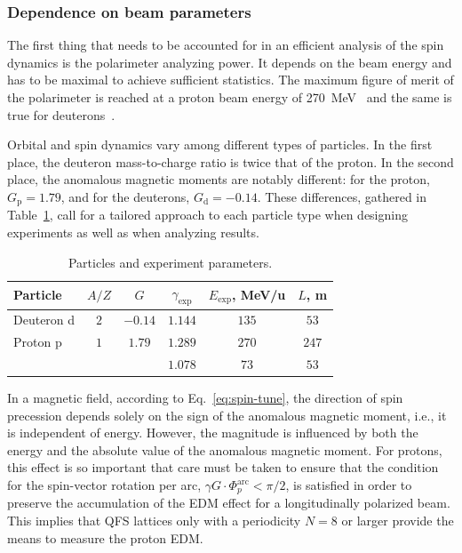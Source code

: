 \documentclass[%
  aps,
  pra,
  preprint,
  a4paper,
  amsmath,
  amssymb,
  floatfix,
  longbibliography,
  superscriptaddress
]{revtex4-2}
\begin{document}
\subsubsection{Dependence on beam parameters}

The first thing that needs to be accounted for in an efficient analysis of
the spin dynamics is the polarimeter analyzing power. It depends on the beam
energy and has to be maximal to achieve sufficient statistics. The maximum
figure of merit of the polarimeter is reached at a proton beam energy of
\SI{270}{MeV}~\cite{Mcnaughton:1985wyt} and the same is true for
deuterons~\cite{Kurilkin:2010ym}.

Orbital and spin dynamics vary among different types of particles. In the
first place, the deuteron mass-to-charge ratio is twice that of the proton.
In the second place, the anomalous magnetic moments are notably different:
for the proton, $G_{\mathrm{p}} = 1.79$, and for the deuterons,
$G_{\mathrm{d}} = -0.14$. These differences, gathered in
Table~\ref{tab:particles}, call for a tailored approach to each particle
type when designing experiments as well as when analyzing results.

\begin{table}[htbp]
  \centering
  \caption{Particles and experiment parameters.}
  \label{tab:particles}
  \begin{tabular}{lccccc}
    \toprule
    Particle & $A/Z$ & $G$ & $\gamma_{\mathrm{exp}}$ & $E_{\mathrm{exp}}$, MeV/u & $L$, m \\
    \midrule
    Deuteron d & $2$ & $-0.14$ & $1.144$ & $135$ & $53$ \\
    Proton p & $1$ & $1.79$ & $1.289$ & $270$ & $247$ \\
    & & & $1.078$ & $73$ & $53$ \\
    \bottomrule
  \end{tabular}
\end{table}

In a magnetic field, according to Eq.~\eqref{eq:spin-tune}, the direction of
spin precession depends solely on the sign of the anomalous magnetic moment,
i.e., it is independent of energy. However, the magnitude is influenced by both
the energy and the absolute value of the anomalous magnetic moment. For protons, this effect is so important that care must be taken to ensure
that the condition for the spin-vector rotation per arc,
$\gamma G \cdot \Phi_{p}^{\mathrm{arc}} < \pi/2$, is satisfied in order to
preserve the accumulation of the EDM effect for a longitudinally polarized
beam. This implies that QFS lattices only with a periodicity $N=8$ or larger
provide the means to measure the proton EDM.
\end{document}
